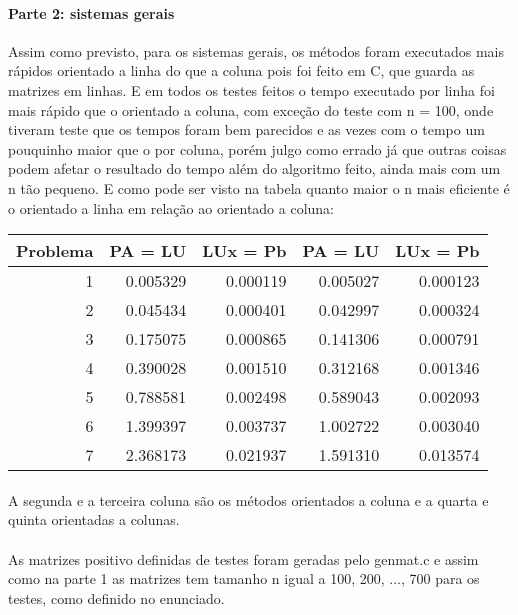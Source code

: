 \documentclass{article}
\begin{document}
	\paragraph{Parte 2: sistemas gerais} Assim como previsto, para os sistemas gerais, os métodos foram executados mais rápidos orientado a linha do que a coluna pois foi feito em C, que guarda as matrizes em linhas. E em todos os testes feitos o tempo executado por linha foi mais rápido que o orientado a coluna, com exceção do teste com n = 100, onde tiveram teste que os tempos foram bem parecidos e as vezes com o tempo um pouquinho maior que o por coluna, porém julgo como errado já que outras coisas podem afetar o resultado do tempo além do algoritmo feito, ainda mais com um n tão pequeno. E como pode ser visto na tabela quanto maior o n mais eficiente é o orientado a linha em relação ao orientado a coluna:
	
	\begin{table}[h]
		\centering
		\vspace{0.1cm}
		\begin{tabular}{r|r|r|r|r}
			Problema & PA = LU & LUx = Pb & PA = LU & LUx = Pb\\
			\hline
			1 & 0.005329 & 0.000119 & 0.005027 & 0.000123 \\
			2 & 0.045434 & 0.000401 & 0.042997 & 0.000324 \\
			3 & 0.175075 & 0.000865 & 0.141306 & 0.000791 \\
			4 & 0.390028 & 0.001510 & 0.312168 & 0.001346 \\
			5 & 0.788581 & 0.002498 & 0.589043 & 0.002093 \\
			6 & 1.399397 & 0.003737 & 1.002722 & 0.003040 \\
			7 & 2.368173 & 0.021937 & 1.591310 & 0.013574
		\end{tabular}
	\end{table}

	\paragraph{} A segunda e a terceira coluna são os métodos orientados a coluna e a quarta e quinta orientadas a colunas.
	
	\paragraph{} As matrizes positivo definidas de testes foram geradas pelo genmat.c e assim como na parte 1 as matrizes tem tamanho n igual a 100, 200, ..., 700 para os testes, como definido no enunciado.
		
\end{document}
